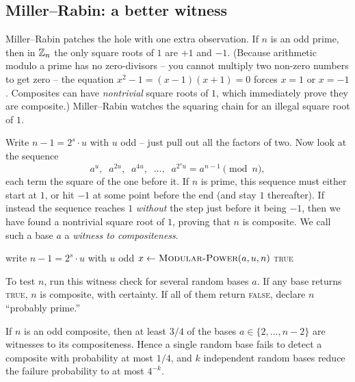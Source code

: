 \subsection{Miller--Rabin: a better witness}

Miller--Rabin patches the hole with one extra observation. If $n$ is an odd prime,
then in $\mathbb{Z}_n$ the only square roots of $1$ are $+1$ and $-1$. (Because arithmetic modulo a prime has no zero-divisors -- you cannot multiply two non-zero numbers to get zero -- the equation $x^2 -
1 = (x-1)(x+1) = 0$ forces $x = 1$ or $x = -1$. Composites can have \emph{nontrivial} square
roots of $1$, which immediately prove they are composite.) Miller--Rabin watches the squaring
chain for an illegal square root of $1$.

Write $n - 1 = 2^{s}\cdot u$ with $u$ odd -- just pull out
all the factors of two. Now look at the sequence
\[
  a^{u},\;\; a^{2u},\;\; a^{4u},\;\; \dots,\;\; a^{2^{s} u} = a^{n-1} \pmod n,
\]
each term the square of the one before it. If $n$ is prime, this sequence must
either start at $1$, or hit $-1$ at some point before the end (and stay $1$
thereafter). If instead the sequence reaches $1$ \emph{without} the step just
before it being $-1$, then we have found a nontrivial square root of $1$,
proving that $n$ is composite. We call such a base $a$ a \emph{witness to
compositeness}.

\begin{algorithm}[H]
\caption{\textsc{Miller--Rabin-Witness}$(a,n)$ -- does $a$ prove $n$ composite?}
\label{ch30:alg-mr}
write $n - 1 = 2^{s}\cdot u$ with $u$ odd\;
$x \leftarrow \textsc{Modular-Power}(a, u, n)$\;
\Return \textsc{true}\;
\end{algorithm}

To test $n$, run this witness check for several random bases $a$. If any base
returns \textsc{true}, $n$ is composite, with certainty. If all of them return
\textsc{false}, declare $n$ ``probably prime.''

\begin{theorem}
\label{ch30:thm-mr}
If $n$ is an odd composite, then at least $3/4$ of the bases $a \in \{2, \dots,
n-2\}$ are witnesses to its compositeness. Hence a single random base fails to
detect a composite with probability at most $1/4$, and $k$ independent random
bases reduce the failure probability to at most $4^{-k}$.
\end{theorem}

